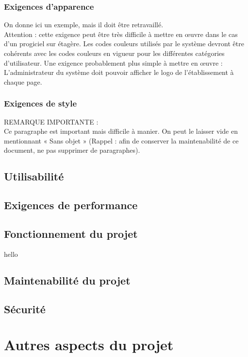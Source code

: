 			\subsubsection{Exigences d’apparence} 
			{\color{red}
			On donne ici un exemple, mais il doit être retravaillé.\\
			Attention : cette exigence peut être très difficile à mettre en œuvre dans le cas d’un progiciel sur étagère.
			Les codes couleurs utilisés par le système devront être cohérents avec les codes couleurs en vigueur pour les différentes catégories d’utilisateur.
			Une exigence probablement plus simple à mettre en œuvre :\\
			L’administrateur du système doit pouvoir afficher le logo de l’établissement à chaque page.
			}
			\subsubsection{Exigences de style}
			{\color{red}
			REMARQUE IMPORTANTE :\\
			Ce paragraphe est important mais difficile à manier. On peut le laisser vide en mentionnant « Sans objet » (Rappel : afin de conserver la maintenabilité de ce document, ne pas supprimer de paragraphes).
			}

		\subsection{Utilisabilité}
		
		\subsection{Exigences de performance}
		
		\subsection{Fonctionnement du projet}
			hello
		\subsection{Maintenabilité du projet}
		
		\subsection{Sécurité}
		
	\section{Autres aspects du projet}
